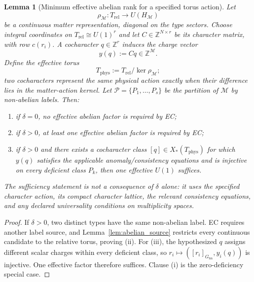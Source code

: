 \documentclass[11pt]{article}
\newtheorem{lemma}[theorem]{Lemma}
\theoremstyle{definition}
\begin{document}
\begin{lemma}[Minimum effective abelian rank for a specified torus action]
\label{lem:min_abelian}
Let
\[
 \rho_{\mathcal M}:T_{\mathrm{rel}}\longrightarrow U(H_{\mathcal M})
\]
be a continuous matter representation, diagonal on the type sectors.
Choose integral coordinates on $T_{\mathrm{rel}}\cong U(1)^r$ and let
$C\in\mathbb Z^{N\times r}$ be its character matrix, with row
$c(r_i)$.  A cocharacter $q\in\mathbb Z^r$ induces the charge vector
\[
  y(q):=Cq\in\mathbb Z^{\mathcal M}.
\]
Define the effective torus
\[
  T_{\mathrm{phys}}:=T_{\mathrm{rel}}/\ker\rho_{\mathcal M};
\]
two cocharacters represent the same physical action exactly when
their difference lies in the matter-action kernel.  Let
$\mathcal P=\{P_1,\ldots,P_s\}$ be the partition of $\mathcal M$ by
non-abelian labels.  Then:
\begin{enumerate}[label=(\roman*),nosep]
  \item if $\delta=0$, no effective abelian factor is required by EC;
  \item if $\delta>0$, at least one effective abelian factor is
  required by EC;
  \item if $\delta>0$ and there exists a cocharacter class
  $[q]\in X_*(T_{\mathrm{phys}})$ for which $y(q)$ satisfies the
  applicable anomaly/consistency equations and is injective on every
  deficient class $P_k$, then one effective $U(1)$ suffices.
\end{enumerate}
The sufficiency statement is not a consequence of $\delta$ alone: it
uses the specified character action, its compact character lattice,
the relevant consistency equations, and any declared universality
conditions on multiplicity spaces.
\end{lemma}

\begin{proof}
If $\delta>0$, two distinct types have the same non-abelian label.  EC
requires another label source, and Lemma~\ref{lem:abelian_source}
restricts every continuous candidate to the relative torus, proving
(ii).  For (iii), the hypothesized $q$ assigns different scalar
charges within every deficient class, so
$r_i\mapsto([r_i]_{G_{\mathrm{na}}},y_i(q))$ is injective.  One
effective factor therefore suffices.  Clause (i) is the zero-deficiency
special case.
\end{proof}
\end{document}

